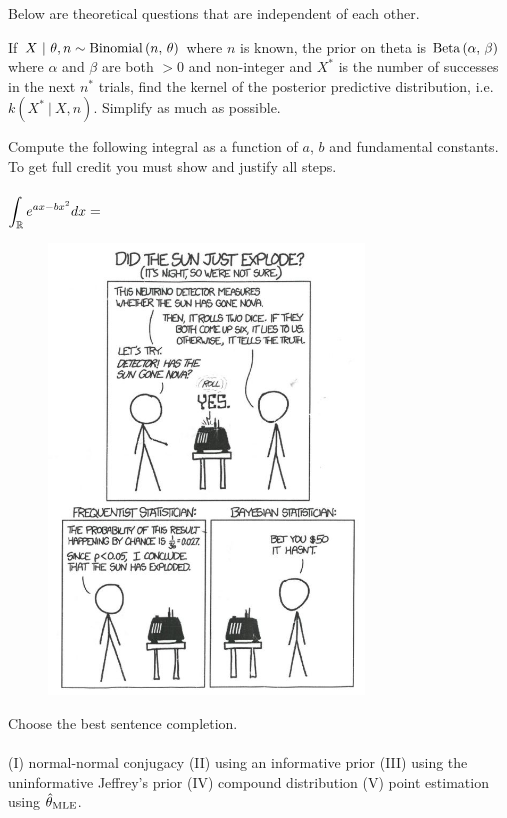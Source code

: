 \documentclass[12pt]{article}
\begin{document}
\eenum

\problem Below are theoretical questions that are independent of each other.

\benum

 If $X~|~\theta,n \sim \mathrm{Binomial}\left(n,\,\theta\right)$ where $n$ is known, the prior on theta is $\mathrm{Beta}\left(\alpha,\,\beta\right)$ where $\alpha$ and $\beta$ are both $>0$ and non-integer and $X^*$ is the number of successes in the next $n^*$ trials, find the kernel of the posterior predictive distribution, i.e. $k(X^*~|~X, n)$. Simplify as much as possible.

 Compute the following integral as a function of $a$, $b$ and fundamental constants. To get full credit you must show and justify all steps. \\~\\
$\displaystyle\int_{\mathbb{R}} e^{ax - bx^2} dx = $


\vspace{-1cm}
\begin{figure}[h]
\centering
\includegraphics[width=3.3in]{comic.jpg}
\end{figure}

Choose the best sentence completion.  \\~\\
(I) normal-normal conjugacy (II) using an informative prior  (III) using the uninformative Jeffrey's prior (IV) compound distribution (V) point estimation using $\hat{\theta}_{\mathrm{MLE}}$.

\eenum
\end{document}
